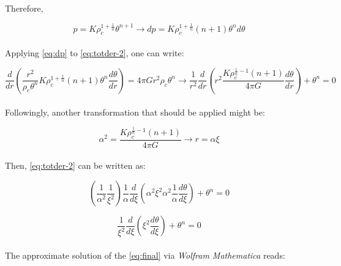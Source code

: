 \documentclass[letterpaper,12pt]{article}
\begin{document}
Therefore, 

\begin{equation}
    \label{eq:dp}
    p = K \rho_c^{1+\frac{1}{n}} \theta^{n+1} \rightarrow dp = K \rho_c^{1+\frac{1}{n}} \left(n+1\right)\theta^n d\theta
\end{equation}

\paragraph{} Applying \eqref{eq:dp} to \eqref{eq:totder-2}, one can write:

\begin{equation}
    \frac{d}{dr}\left(\frac{r^2}{\rho_c \theta^n} K \rho_c^{1+\frac{1}{n}} \left(n+1\right)\theta^n \frac{d\theta}{dr}\right) = 4\pi G r^2 \rho_c \theta^n \rightarrow \frac{1}{r^2}\frac{d}{dr}\left(r^2 \frac{K \rho_c^{\frac{1}{n}-1} \left(n+1\right)}{4 \pi G} \frac{d\theta}{dr}\right) + \theta^n = 0
\end{equation}

\paragraph{} Followingly, another transformation that should be applied might be:

\begin{equation}
    \label{eq:alpha}
    \alpha^2 = \frac{K \rho_c^{\frac{1}{n}-1} \left(n+1\right)}{4 \pi G} \rightarrow r = \alpha \xi
\end{equation}

\paragraph{} Then, \eqref{eq:totder-2} can be written as:

\begin{equation*}
    \left(\frac{1}{\alpha^2}\frac{1}{\xi^2}\right)\frac{1}{\alpha}\frac{d}{d\xi}\left(\alpha^2\xi^2\alpha^2\frac{1}{\alpha}\frac{d\theta}{d\xi}\right) + \theta^n = 0
\end{equation*}

\begin{equation}
    \label{eq:final}
   \frac{1}{\xi^2}\frac{d}{d\xi}\left(\xi^2\frac{d\theta}{d\xi}\right) + \theta^n = 0
\end{equation}

\paragraph{} The approximate solution of the \eqref{eq:final} via \textit{Wolfram Mathematica} reads:
\end{document}
